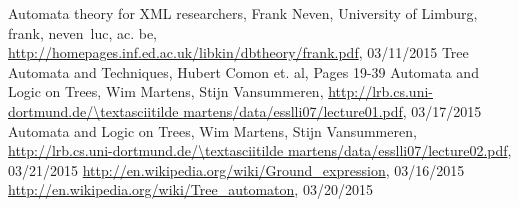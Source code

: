 \documentclass{llncs}
\begin{document}
%
%
\begin{thebibliography}{99}
%
	Automata theory for XML researchers,
	Frank Neven,
	University of Limburg,
	frank, neven~luc, ac. be,
	\url{http://homepages.inf.ed.ac.uk/libkin/dbtheory/frank.pdf}, 03/11/2015
	Tree Automata and Techniques, Hubert Comon et. al, Pages 19-39
	Automata and Logic on Trees,
	Wim Martens,
	Stijn Vansummeren,
	\url{http://lrb.cs.uni-dortmund.de/\textasciitilde martens/data/esslli07/lecture01.pdf}, 03/17/2015
	Automata and Logic on Trees,
	Wim Martens,
	Stijn Vansummeren,
	\url{http://lrb.cs.uni-dortmund.de/\textasciitilde martens/data/esslli07/lecture02.pdf}, 03/21/2015
	\url{http://en.wikipedia.org/wiki/Ground\_expression}, 03/16/2015
	\url{http://en.wikipedia.org/wiki/Tree\_automaton}, 03/20/2015




\end{thebibliography}
\end{document}
